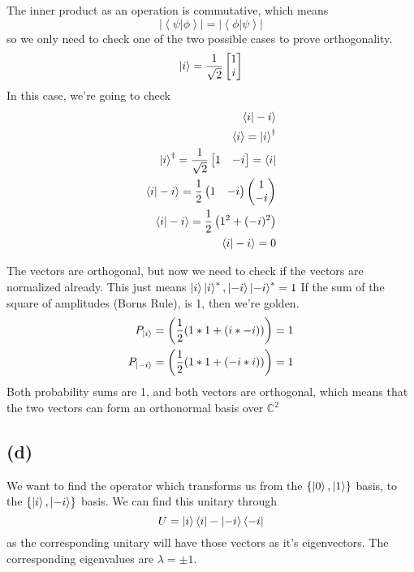 \documentclass[]{article}
\begin{document}
The inner product as an operation is commutative, which means \[
|\left<\psi|\phi\right>| = |\left<\phi|\psi\right>  |
\] so we only need to check one of the two possible cases to prove
orthogonality. \[
\ket{i}  = \frac{1}{\sqrt{ 2 }} \begin{bmatrix}
1 \\
i
\end{bmatrix}
\] In this case, we're going to check \[
\begin{align}
\left<i|-i \right> \\
\braket{ i}  = \ket{i} ^{\dagger} \\
\ket{i} ^{\dagger} = \frac{1}{\sqrt{ 2 }}\begin{bmatrix}
1 & -i
\end{bmatrix}=\bra{i}  \\  
\left<i |  -i\right>  = \frac{1}{2} \begin{pmatrix}
1 & -i
\end{pmatrix}\begin{pmatrix}
1 \\
-i
\end{pmatrix} \\
\left<i|-i\right> = \frac{1}{2}\left( 1^{2}+(-i)^{2} \right) \\
\left<i|-i\right>   =0
\end{align}
\]

The vectors are orthogonal, but now we need to check if the vectors are
normalized already. This just means
\(\ket{i}\ket{i}^{*},\ket{-i}\ket{-i}^{*}=1\) If the sum of the square
of amplitudes (Borns Rule), is 1, then we're golden. \[
\begin{align}
P_{\ket{i} } =\left( \frac{1}{2}(1*1+(i*-i)) \right)  = 1 \\
P_{\ket{-i} } =\left( \frac{1}{2}(1*1+(-i*i)) \right)  = 1 \\
\end{align}
\] Both probability sums are 1, and both vectors are orthogonal, which
means that the two vectors can form an orthonormal basis over
\(\mathbb{C}^{2}\)

\hypertarget{d-2}{%
\subsection{(d)}\label{d-2}}

We want to find the operator which transforms us from the
\(\left\{ \ket{0},\ket{1} \right\}\) basis, to the
\(\left\{ \ket{i},\ket{-i} \right\}\) basis. We can find this unitary
through \[
U = \ket{i} \bra{i} -\ket{-i} \bra{-i}  
\] as the corresponding unitary will have those vectors as it's
eigenvectors. The corresponding eigenvalues are \(\lambda=\pm 1\).
\end{document}

